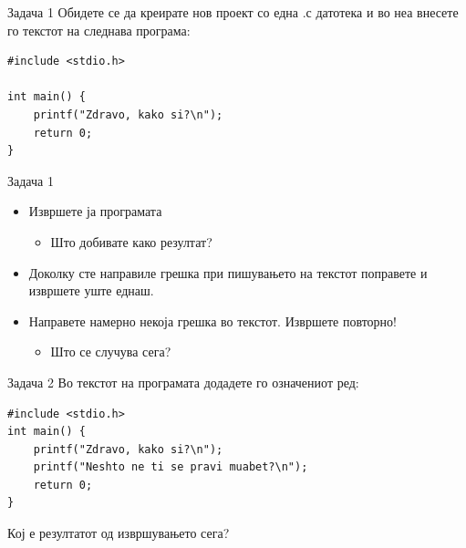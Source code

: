 \begin{frame}[fragile]{Задача 1}
Обидете се да креирате нов проект со една .с датотека и во неа внесете го
текстот на следнава програма:
\begin{lstlisting}
#include <stdio.h>

int main() {
    printf("Zdravo, kako si?\n");
    return 0;
}
\end{lstlisting}

\end{frame}

\begin{frame}{Задача 1}
\begin{itemize}
  \item Извршете ја програмата
\begin{itemize}
  \item Што добивате како резултат?
\end{itemize}
  \item Доколку сте направиле грешка при пишувањето на текстот поправете и
  извршете уште еднаш. 
  \item Направете намерно некоја грешка во текстот. Извршете повторно!
\begin{itemize}
  \item Што се случува сега?
\end{itemize}
\end{itemize}
\end{frame}

\begin{frame}[fragile]{Задача 2}
Во текстот на програмата додадете го означениот ред:
\begin{lstlisting}
#include <stdio.h>
int main() {
    printf("Zdravo, kako si?\n");
    printf("Neshto ne ti se pravi muabet?\n");
    return 0;
}
\end{lstlisting}
Кој е резултатот од извршувањето сега?
\end{frame}
